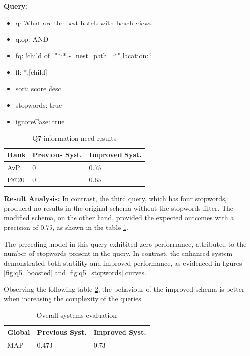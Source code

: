\documentclass[sigconf]{acmart}
\begin{document}
\textbf{Query:}

\begin{itemize}
    \item q: What are the best hotels with beach views
    \item q.op: AND
    \item fq: {!child of="*:* -\_nest\_path\_:*"} location:*
    \item fl: *,[child]
    \item sort: score desc
    \item stopwords: true
    \item ignoreCase: true
\end{itemize}

\begin{table}[H]
\caption{Q7 information need results}
\label{tab:q7}
\begin{tabular}{lll}
\toprule
Rank & Previous Syst. & Improved Syst.\\
\midrule
AvP & 0 & 0.75  \\
P@20 & 0 & 0.65 \\
\bottomrule
\end{tabular}
\end{table}

\textbf{Result Analysis:} In contrast, the third query, which has four stopwords, produced no results in the original schema without the stopwords filter. The modified schema, on the other hand, provided the expected outcomes with a precision of 0.75, as shown in the table \ref{tab:q7}.

The preceding model in this query exhibited zero performance, attributed to the number of stopwords present in the query. In contrast, the enhanced system demonstrated both stability and improved performance, as evidenced in figures \ref{fig:q5_boosted} and \ref{fig:q5_stopwords} curves.

Observing the following table \ref{tab:map_stopwords}, the behaviour of the improved schema is better when increasing the complexity of the queries.

\begin{table}[H]
\caption{Overall systems evaluation}
\label{tab:map_stopwords}
\begin{tabular}{lll}
\toprule
Global & Previous Syst. & Improved Syst.\\
\midrule
MAP & 0.473 & 0.73  \\

\bottomrule
\end{tabular}
\end{table}
\end{document}
